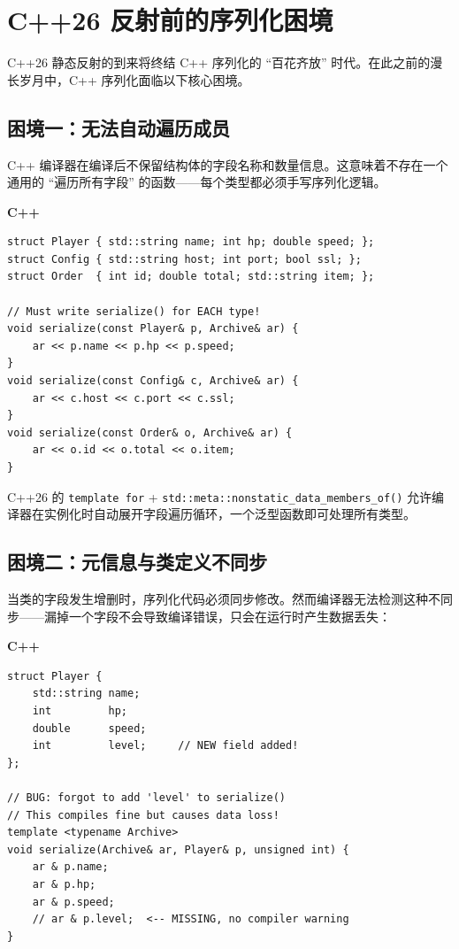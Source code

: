 \documentclass[12pt,a4paper,fontset=fandol]{ctexbook}
\newcommand{\Fn}[1]{\texttt{#1()}}
\newcommand{\cpplabel}{%
  \noindent\begin{tcolorbox}[colback=algheadbg,coltext=white,
    sharp corners,boxrule=0pt,width=3.0em,height=1.4em,
    halign=center,valign=center,nobeforeafter,left=0pt,right=0pt,
    top=0pt,bottom=0pt]\small\bfseries C++\end{tcolorbox}}
\begin{document}
\chapter{C++26 反射前的序列化困境}\label{ch:dilemma}

C++26 静态反射的到来将终结 C++ 序列化的 ``百花齐放'' 时代。在此之前的漫长岁月中，C++ 序列化面临以下核心困境。

\section{困境一：无法自动遍历成员}\label{sec:no-traverse}

C++ 编译器在编译后不保留结构体的字段名称和数量信息。这意味着不存在一个通用的 ``遍历所有字段'' 的函数——每个类型都必须手写序列化逻辑。

\cpplabel
\begin{lstlisting}[caption={C++26 前: 每个类型都需要手写序列化}]
struct Player { std::string name; int hp; double speed; };
struct Config { std::string host; int port; bool ssl; };
struct Order  { int id; double total; std::string item; };

// Must write serialize() for EACH type!
void serialize(const Player& p, Archive& ar) {
    ar << p.name << p.hp << p.speed;
}
void serialize(const Config& c, Archive& ar) {
    ar << c.host << c.port << c.ssl;
}
void serialize(const Order& o, Archive& ar) {
    ar << o.id << o.total << o.item;
}
\end{lstlisting}

\begin{compare}[title={C++26 反射如何解决}]
C++26 的 \texttt{template for} + \Fn{std::meta::nonstatic\_data\_members\_of} 允许编译器在实例化时自动展开字段遍历循环，一个泛型函数即可处理所有类型。
\end{compare}

\section{困境二：元信息与类定义不同步}\label{sec:out-of-sync}

当类的字段发生增删时，序列化代码必须同步修改。然而编译器无法检测这种不同步——漏掉一个字段不会导致编译错误，只会在运行时产生数据丢失：

\cpplabel
\begin{lstlisting}[caption={C++26 前: 序列化代码与类定义容易不同步}]
struct Player {
    std::string name;
    int         hp;
    double      speed;
    int         level;     // NEW field added!
};

// BUG: forgot to add 'level' to serialize()
// This compiles fine but causes data loss!
template <typename Archive>
void serialize(Archive& ar, Player& p, unsigned int) {
    ar & p.name;
    ar & p.hp;
    ar & p.speed;
    // ar & p.level;  <-- MISSING, no compiler warning
}
\end{lstlisting}
\end{document}
